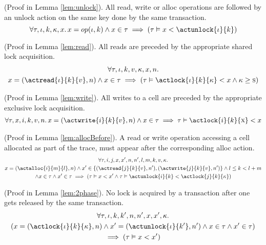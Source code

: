 \begin{prop}
	\label{prop:unlock}
	(Proof in Lemma \ref{lem:unlock}).
	All read, write or alloc operations are followed by an unlock action on the same key done by the same transaction.
	\[
		\forall \tau, \iota, k, \kappa, x \ldotp
		x = op(\iota, k) \land x \in \tau \implies \left( \tau \vDash x < \actunlock{\iota}{k} \right)
	\]
\end{prop}

\begin{prop}
	\label{prop:read}
	(Proof in Lemma \ref{lem:read}).
	All reads are preceded by the appropriate shared lock acquisition.
	\begin{gather*}
		\forall \tau, \iota, k, v, \kappa, x, n \ldotp \\
		x = (\actread{\iota}{k}{v}, n) \land x \in \tau \implies \left( \tau \vDash \actlock{\iota}{k}{\kappa} < x \land \kappa \geq \textsc{s} \right)
	\end{gather*}
\end{prop}

\begin{prop}
	\label{prop:write}
	(Proof in Lemma \ref{lem:write}).
	All writes to a cell are preceded by the appropriate exclusive lock acquisition.
	\begin{gather*}
		\forall \tau, x, i, k, v, n \ldotp
		x = (\actwrite{i}{k}{v}, n) \land x \in \tau \implies
		\tau \vDash \actlock{i}{k}{\textsc{x}} < x
	\end{gather*}
\end{prop}

\begin{prop}
	\label{prop:allocBefore}
	(Proof in Lemma \ref{lem:allocBefore}).
	A read or write operation accessing a cell allocated as part of the trace, must appear after the corresponding alloc action.
	\begin{gather*}
		\forall \tau, i, j, x, x', n, n', l, m, k, v, \kappa \ldotp \\
		x = (\actalloc{i}{m}{l}, n) \land x' \in \{ (\actread{j}{k}{v}, n'), (\actwrite{j}{k}{v}, n') \} \land l \leq k < l + m
		\\
		\land x \in \tau \land x' \in \tau
		\implies
		\left( \tau \vDash x < x'  \land \tau \vDash \actunlock{i}{k} < \actlock{j}{k}{\kappa} \right)
	\end{gather*}
\end{prop}

\begin{prop}
	\label{prop:2phase}
	(Proof in Lemma \ref{lem:2phase}).
	No lock is acquired by a transaction after one gets released by the same transaction.
	\begin{gather*}
		\forall \tau, \iota, k, k', n, n', x, x', \kappa \ldotp \\
		\left( x = (\actlock{\iota}{k}{\kappa}, n) \land x' = (\actunlock{\iota}{k'}, n') \land x \in \tau \land x' 	\in \tau \right) \\
		\implies \left( \tau \vDash x < x' \right)
	\end{gather*}
\end{prop}

